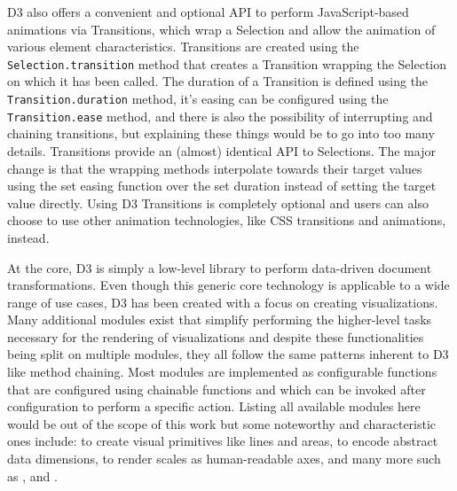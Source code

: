 D3 also offers a convenient and optional API to perform JavaScript-based animations via Transitions, which wrap a Selection and allow the animation of various element characteristics. Transitions are created using the \lstinline{Selection.transition} method that creates a Transition wrapping the  Selection on which it has been called. The duration of a Transition is defined using the \lstinline{Transition.duration} method, it's easing can be configured using the \lstinline{Transition.ease} method, and there is also the possibility of interrupting and chaining transitions, but explaining these things would be to go into too many details. Transitions provide an (almost) identical API to Selections. The major change is that the wrapping methods interpolate towards their target values using the set easing function over the set duration instead of setting the target value directly. Using D3 Transitions is completely optional and users can also choose to use other animation technologies, like CSS transitions and animations, instead.

At the core, D3 is simply a low-level library to perform data-driven document transformations. Even though this generic core technology is applicable to a wide range of use cases, D3 has been created with a focus on creating visualizations. Many additional modules exist that simplify performing the higher-level tasks necessary for the rendering of visualizations and despite these functionalities being split on multiple modules, they all follow the same patterns inherent to D3 like method chaining. Most modules are implemented as configurable functions that are configured using chainable functions and which can be invoked after configuration to perform a specific action. Listing all available modules here would be out of the scope of this work but some noteworthy and characteristic ones include:  to create visual primitives like lines and areas,  to encode abstract data dimensions,  to render scales as human-readable axes, and many more such as ,  and . 




